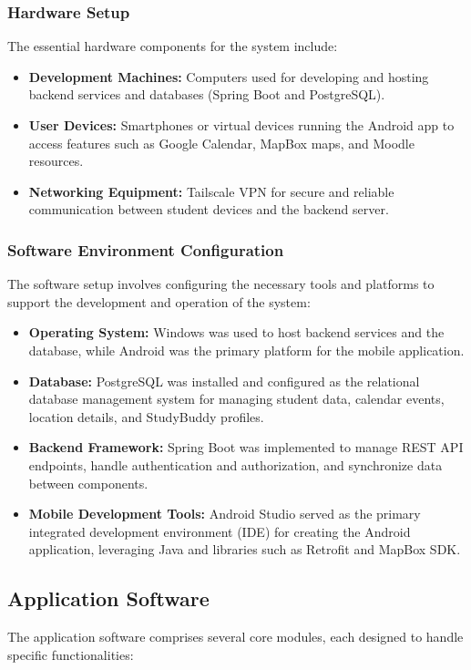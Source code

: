 \documentclass[12pt]{article}
\begin{document}
\subsubsection{Hardware Setup}  
The essential hardware components for the system include:  
\begin{itemize}  
    \item \textbf{Development Machines: }Computers used for developing and hosting backend services and databases (Spring Boot and PostgreSQL).  
    \item \textbf{User Devices: }Smartphones or virtual devices running the Android app to access features such as Google Calendar, MapBox maps, and Moodle resources.  
    \item \textbf{Networking Equipment: }Tailscale VPN for secure and reliable communication between student devices and the backend server.  
\end{itemize}


\subsubsection{Software Environment Configuration}  
The software setup involves configuring the necessary tools and platforms to support the development and operation of the system:  
\begin{itemize}  
    \item \textbf{Operating System: }Windows was used to host backend services and the database, while Android was the primary platform for the mobile application.  
    \item \textbf{Database: }PostgreSQL was installed and configured as the relational database management system for managing student data, calendar events, location details, and StudyBuddy profiles.  
    \item \textbf{Backend Framework: }Spring Boot was implemented to manage REST API endpoints, handle authentication and authorization, and synchronize data between components.  
    \item \textbf{Mobile Development Tools: }Android Studio served as the primary integrated development environment (IDE) for creating the Android application, leveraging Java and libraries such as Retrofit and MapBox SDK.  
\end{itemize}

\subsection{Application Software}  
The application software comprises several core modules, each designed to handle specific functionalities:  
\end{document}
